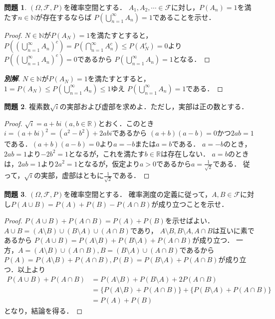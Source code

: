 \documentclass{jsarticle}
\theoremstyle{definition}
\newtheorem{qst}{問題}
\begin{document}
\begin{qst}
$(\Omega,\mathcal{F},P)$を確率空間とする．
$A_1,A_2,\cdots\in\mathcal{F}$に対し，$P(A_n)=1$を満たす$n\in\mathbb{N}$が存在するならば
$P(\bigcup_{n=1}^\infty A_n)=1$であることを示せ．
\end{qst}
\begin{proof}
$N\in\mathbb{N}$が$P(A_N)=1$を満たすとすると，
$P((\bigcup_{n=1}^\infty A_n)^c)=P(\bigcap_{n=1}^\infty A_n^c)\leq P(A_N^c)=0$より
$P((\bigcup_{n=1}^\infty A_n)^c)=0$であるから
$P(\bigcup_{n=1}^\infty A_n)=1$となる．
\end{proof}
\begin{proof}[\textbf{別解}]
$N\in\mathbb{N}$が$P(A_N)=1$を満たすとすると，
$1=P(A_N)\leq P(\bigcup_{n=1}^\infty A_n)\leq1$ゆえ
$P(\bigcup_{n=1}^\infty A_n)=1$である．
\end{proof}

\begin{qst}
複素数$\sqrt{i}$の実部および虚部を求めよ．ただし，実部は正の数とする．
\end{qst}
\begin{proof}
$\sqrt{i}=a+bi\ (a,b\in\mathbb{R})$とおく．このとき$i=(a+bi)^2=(a^2-b^2)+2abi$であるから
$(a+b)(a-b)=0$かつ$2ab=1$である．$(a+b)(a-b)=0$より$a=-b$または$a=b$である．
$a=-b$のとき，$2ab=1$より$-2b^2=1$となるが，これを満たす$b\in\mathbb{R}$は存在しない．
$a=b$のときは，$2ab=1$より$2a^2=1$となるが，仮定より$a>0$であるから$a=\frac{1}{\sqrt{2}}$である．
従って，$\sqrt{i}$の実部，虚部はともに$\frac{1}{\sqrt{2}}$である．
\end{proof}

\begin{qst}
$(\Omega,\mathcal{F},P)$を確率空間とする．
確率測度の定義に従って，$A,B\in\mathcal{F}$に対し$P(A\cup B)=P(A)+P(B)-P(A\cap B)$が成り立つことを示せ．
\end{qst}
\begin{proof}
$P(A\cup B)+P(A\cap B)=P(A)+P(B)$を示せばよい．
$A\cup B=(A\setminus B)\cup(B\setminus A)\cup(A\cap B)$であり，
$A\setminus B, B\setminus A, A\cap B$は互いに素であるから
$P(A\cup B)=P(A\setminus B)+P(B\setminus A)+P(A\cap B)$が成り立つ．
一方，$A=(A\setminus B)\cup(A\cap B), B=(B\setminus A)\cup(A\cap B)$であるから
$P(A)=P(A\setminus B)+P(A\cap B), P(B)=P(B\setminus A)+P(A\cap B)$が成り立つ．以上より
\begin{align*}
P(A\cup B)+P(A\cap B)
&=P(A\setminus B)+P(B\setminus A)+2P(A\cap B) \\
&=\{P(A\setminus B)+P(A\cap B)\}+\{P(B\setminus A)+P(A\cap B)\} \\
&=P(A)+P(B)
\end{align*}
となり，結論を得る．
\end{proof}
\end{document}
